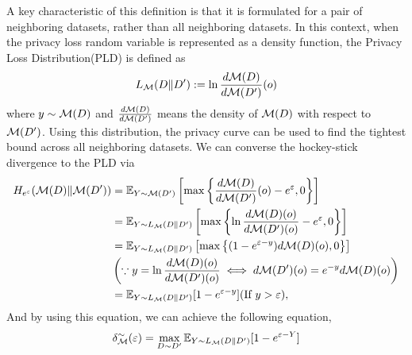 \documentclass{article}
\begin{document}
A key characteristic of this definition is that it is formulated for a pair of neighboring datasets, rather than all neighboring datasets. In this context, when the privacy loss random variable is represented as a density function, the Privacy Loss Distribution(PLD) is defined as
\begin{equation}
    L_{\mathcal{M}} (D \Vert D') := \ln \frac{d {\mathcal{M}}(D)}{d {\mathcal{M}}(D')}(o) 
\end{equation} 
where $y \sim {\mathcal{M}}(D)$ and $\frac{d {\mathcal{M}}(D)}{d {\mathcal{M}}(D')}$ means the density of ${\mathcal{M}}(D)$ with respect to ${\mathcal{M}}(D')$. Using this distribution, the privacy curve can be used to find the tightest bound across all neighboring datasets. We can converse the hockey-stick divergence to the PLD via
\begin{align*}
    H_{e^\varepsilon}({\mathcal{M}}(D) \Vert {\mathcal{M}}(D')) &=\mathbb{E}_{Y \sim {\mathcal{M}} (D')}\left[\max\left\{\frac{d{\mathcal{M}}(D)}{d{\mathcal{M}}(D')}(o) - e^{\varepsilon},0\right\}\right]  \\ 
    &=\mathbb{E}_{Y \sim L_{\mathcal{M}}(D \Vert D')}\left[\max\left\{\ln\frac{d{\mathcal{M}}(D)(o)}{d{\mathcal{M}}(D')(o)}- e^{\varepsilon} ,0 \right\} \right]\\ 
    &=\mathbb{E}_{Y \sim L_{\mathcal{M}} (D \Vert D')}\left[\max\left\{(1- e^{\varepsilon-y})d{\mathcal{M}}(D)(o),0 \right\} \right] \\
    &\left(\because y = \ln\frac{d{\mathcal{M}}(D)(o)}{d{\mathcal{M}}(D')(o)} \iff d{\mathcal{M}}(D')(o) = e^{-y} d{\mathcal{M}}(D)(o)\right)\\
    &=\mathbb{E}_{Y \sim L_{\mathcal{M}} (D \Vert D')} [1-e^{\varepsilon-y}] (\text{If $y>\varepsilon$)},    
\end{align*}
And by using this equation, we can achieve the following equation,
\begin{equation}
    \delta_{\mathcal{M}}^\sim (\varepsilon) = \max_{D\sim D'} \mathbb{E}_{Y \sim L_{\mathcal{M}} (D \Vert D')} [1-e^{\varepsilon-Y}]
\end{equation}
\end{document}
